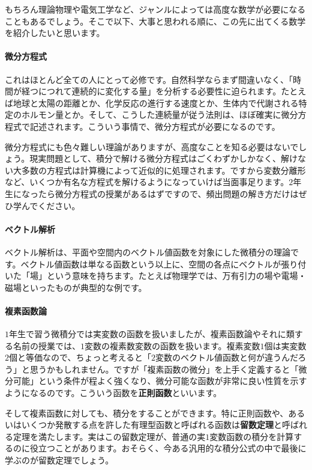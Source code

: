 もちろん理論物理や電気工学など、ジャンルによっては高度な数学が必要になることもあるでしょう。そこで以下、大事と思われる順に、この先に出てくる数学を紹介したいと思います。

\paragraph{微分方程式}

これはほとんど全ての人にとって必修です。自然科学ならまず間違いなく、「時間が経つにつれて連続的に変化する量」を分析する必要性に迫られます。たとえば地球と太陽の距離とか、化学反応の進行する速度とか、生体内で代謝される特定のホルモン量とか。そして、こうした連続量が従う法則は、ほぼ確実に微分方程式で記述されます。こういう事情で、微分方程式が必要になるのです。

微分方程式にも色々難しい理論がありますが、高度なことを知る必要はないでしょう。現実問題として、積分で解ける微分方程式はごくわずかしかなく、解けない大多数の方程式は計算機によって近似的に処理されます。ですから変数分離形など、いくつか有名な方程式を解けるようになっていけば当面事足ります。$2$年生になったら微分方程式の授業があるはずですので、頻出問題の解き方だけはぜひ学んでください。

\paragraph{ベクトル解析}

ベクトル解析は、平面や空間内のベクトル値函数を対象にした微積分の理論です。ベクトル値函数は単なる函数という以上に、空間の各点にベクトルが張り付いた「場」という意味を持ちます。たとえば物理学では、万有引力の場や電場・磁場といったものが典型的な例です。

\paragraph{複素函数論}

$1$年生で習う微積分では実変数の函数を扱いましたが、複素函数論やそれに類する名前の授業では、$1$変数の複素数変数の函数を扱います。複素変数$1$個は実変数$2$個と等価なので、ちょっと考えると「$2$変数のベクトル値函数と何が違うんだろう」と思うかもしれません。ですが「複素函数の微分」を上手く定義すると「微分可能」という条件が程よく強くなり、微分可能な函数が非常に良い性質を示すようになるのです。こういう函数を\textbf{正則函数}といいます。

そして複素函数に対しても、積分をすることができます。特に正則函数や、あるいはいくつか発散する点を許した有理型函数と呼ばれる函数は\textbf{留数定理}と呼ばれる定理を満たします。実はこの留数定理が、普通の実$1$変数函数の積分を計算するのに役立つことがあります。おそらく、今ある汎用的な積分公式の中で最後に学ぶのが留数定理でしょう。

